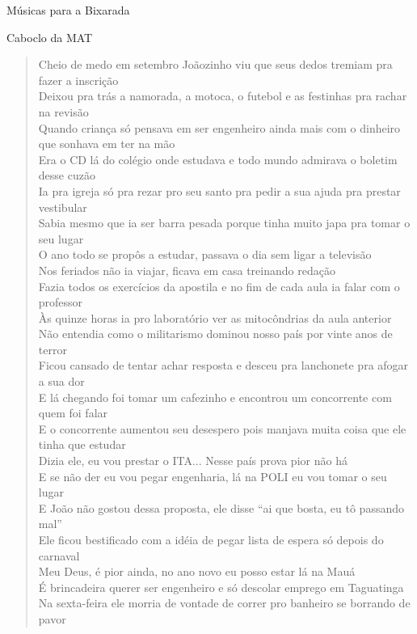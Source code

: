 \begin{secao}{Músicas para a Bixarada}
\begin{subsecao}{Caboclo da MAT}
\begin{verse}
\footnotesize{
Cheio de medo em setembro Joãozinho viu que seus dedos tremiam pra fazer a
inscrição\\
Deixou pra trás a namorada, a motoca, o futebol e as festinhas pra rachar na
revisão\\
Quando criança só pensava em ser engenheiro ainda mais com o dinheiro que
sonhava em ter na mão\\
Era o CD lá do colégio onde estudava e todo mundo admirava o boletim desse
cuzão\\
Ia pra igreja só pra rezar pro seu santo pra pedir a sua ajuda pra prestar
vestibular\\
Sabia mesmo que ia ser barra pesada porque tinha muito japa pra tomar o seu
lugar\\
O ano todo se propôs a estudar, passava o dia sem ligar a televisão\\
Nos feriados não ia viajar, ficava em casa treinando redação\\
Fazia todos os exercícios da apostila e no fim de cada aula ia falar com o
professor\\
Às quinze horas ia pro laboratório ver as mitocôndrias da aula anterior\\
Não entendia como o militarismo dominou nosso país por vinte anos de terror\\
Ficou cansado de tentar achar resposta e desceu pra lanchonete pra afogar a sua
dor\\
E lá chegando foi tomar um cafezinho e encontrou um concorrente com quem foi
falar\\
E o concorrente aumentou seu desespero pois manjava muita coisa que ele tinha
que estudar\\
Dizia ele, eu vou prestar o ITA... Nesse país prova pior não há\\
E se não der eu vou pegar engenharia, lá na POLI eu vou tomar o seu lugar\\
E João não gostou dessa proposta, ele disse ``ai que bosta, eu tô passando mal''\\
Ele ficou bestificado com a idéia de pegar lista de espera só depois do carnaval\\
Meu Deus, é pior ainda, no ano novo eu posso estar lá na Mauá\\
É brincadeira querer ser engenheiro e só descolar emprego em Taguatinga\\
Na sexta-feira ele morria de vontade de correr pro banheiro se borrando de pavor\\
}
\end{verse}
\end{subsecao}
\end{secao}
